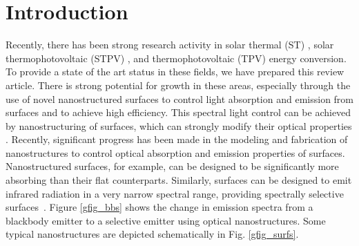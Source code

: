 \documentclass[review]{elsarticle}
\begin{document}
\linenumbers

\providecommand{\noopsort}[1]{}\providecommand{\singleletter}[1]{#1}%
   
               

\section{Introduction}
Recently, there has been strong research activity in solar thermal (ST) \cite{g1,g2}, solar thermophotovoltaic (STPV) \cite{g3,g4,g5,nnn1}, and thermophotovoltaic (TPV) \cite{g6,g7} energy conversion.  To provide a state of the art status in 
these fields, we have prepared this review article.  There is strong potential for growth in these areas, especially 
through the use of novel nanostructured surfaces to control light absorption and emission from surfaces and to 
achieve high efficiency. This spectral light control can be achieved by nanostructuring of surfaces, 
which can strongly modify their optical properties \cite{g8,g9,RF_OptExp_2009}. Recently, significant progress has been made in the modeling and fabrication of nanostructures to control optical absorption and emission properties of surfaces. 
Nanostructured surfaces, for example, can be designed to be significantly
more absorbing than their flat counterparts.
Similarly, surfaces can be designed to emit infrared radiation in a very narrow spectral range, providing spectrally selective 
surfaces~\cite{G_PS_1985, C_RPP_2014}.  Figure \ref{gfig_bbs} shows the change in 
emission spectra from a blackbody emitter to a selective emitter using optical nanostructures.
Some typical nanostructures are depicted schematically in Fig. \ref{gfig_surfs}.
\end{document}
